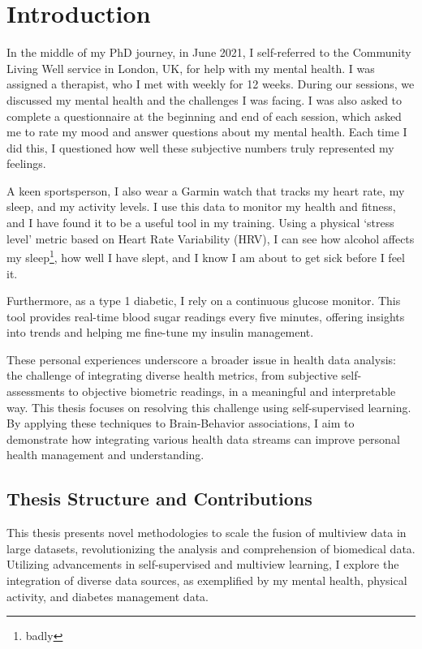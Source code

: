 \graphicspath{{chapters/introduction/}}


\chapter{Introduction}\label{chap:introduction}

In the middle of my PhD journey, in June 2021, I self-referred to the Community Living Well service in London, UK, for help with my mental health. I was assigned a therapist, who I met with weekly for 12 weeks. During our sessions, we discussed my mental health and the challenges I was facing. I was also asked to complete a questionnaire at the beginning and end of each session, which asked me to rate my mood and answer questions about my mental health. Each time I did this, I questioned how well these subjective numbers truly represented my feelings.

A keen sportsperson, I also wear a Garmin watch that tracks my heart rate, my sleep, and my activity levels. I use this data to monitor my health and fitness, and I have found it to be a useful tool in my training. Using a physical `stress level' metric based on Heart Rate Variability (HRV), I can see how alcohol affects my sleep\footnote{badly}, how well I have slept, and I know I am about to get sick before I feel it.

Furthermore, as a type 1 diabetic, I rely on a continuous glucose monitor. This tool provides real-time blood sugar readings every five minutes, offering insights into trends and helping me fine-tune my insulin management.

These personal experiences underscore a broader issue in health data analysis: the challenge of integrating diverse health metrics, from subjective self-assessments to objective biometric readings, in a meaningful and interpretable way. This thesis focuses on resolving this challenge using self-supervised learning. By applying these techniques to Brain-Behavior associations, I aim to demonstrate how integrating various health data streams can improve personal health management and understanding.


\section{Thesis Structure and Contributions}


This thesis presents novel methodologies to scale the fusion of multiview data in large datasets, revolutionizing the analysis and comprehension of biomedical data. Utilizing advancements in self-supervised and multiview learning, I explore the integration of diverse data sources, as exemplified by my mental health, physical activity, and diabetes management data.

